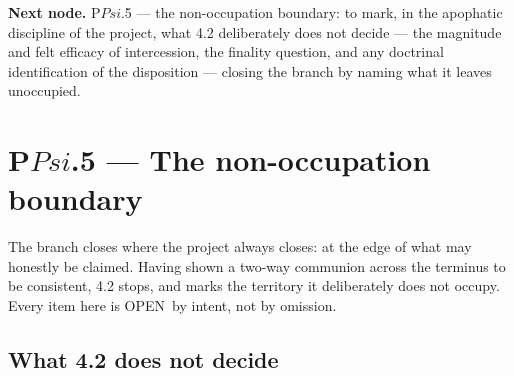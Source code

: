 \documentclass[11pt,a4paper]{article}
\def\Psi{Psi}%
\def\emph#1{#1}%
\newcommand{\stOpen}{\textcolor{cOpn}{\textsf{\small OPEN}}}
\theoremstyle{definition}
\theoremstyle{plain}
\theoremstyle{remark}
\begin{document}
\medskip
\textbf{Next node.} P$\Psi$.5 --- the non-occupation boundary: to mark, in the apophatic
discipline of the project, what 4.2 deliberately does not decide --- the magnitude and felt
efficacy of intercession, the finality question, and any doctrinal identification of the
disposition --- closing the branch by naming what it leaves unoccupied.

\section{P$\Psi$.5 --- The non-occupation boundary}

The branch closes where the project always closes: at the edge of what may honestly be
claimed. Having shown a two-way communion across the terminus to be \emph{consistent}, 4.2
stops, and marks the territory it deliberately does not occupy. Every item here is \stOpen\ by
intent, not by omission.

\subsection{What 4.2 does not decide}
\end{document}
